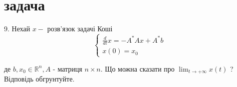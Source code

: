 
\section{задача}
\begin{tcolorbox}[title=Умова]
9. Нехай $x-$ розв'язок задачі Коші
$$
\left\{\begin{array}{l}
\frac{d}{d t} x=-A^* A x+A^* b \\
x(0)=x_0
\end{array}\right.
$$

де $b, x_0 \in \mathbb{R}^n, A$ - матриця $n \times n$. Що можна сказати про $\lim _{t \rightarrow+\infty} x(t)$ ? Відповідь обгрунтуйте.
\end{tcolorbox}
